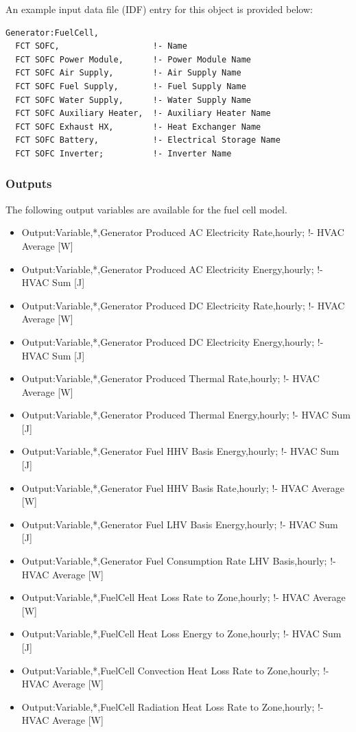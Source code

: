 An example input data file (IDF) entry for this object is provided below:

\begin{lstlisting}
Generator:FuelCell,
  FCT SOFC,                   !- Name
  FCT SOFC Power Module,      !- Power Module Name
  FCT SOFC Air Supply,        !- Air Supply Name
  FCT SOFC Fuel Supply,       !- Fuel Supply Name
  FCT SOFC Water Supply,      !- Water Supply Name
  FCT SOFC Auxiliary Heater,  !- Auxiliary Heater Name
  FCT SOFC Exhaust HX,        !- Heat Exchanger Name
  FCT SOFC Battery,           !- Electrical Storage Name
  FCT SOFC Inverter;          !- Inverter Name
\end{lstlisting}

\subsubsection{Outputs}\label{outputs-9-001}

The following output variables are available for the fuel cell model.

\begin{itemize}
\item
  Output:Variable,*,Generator Produced AC Electricity Rate,hourly; !- HVAC Average {[}W{]}
\item
  Output:Variable,*,Generator Produced AC Electricity Energy,hourly; !- HVAC Sum {[}J{]}
\item
  Output:Variable,*,Generator Produced DC Electricity Rate,hourly; !- HVAC Average {[}W{]}
\item
  Output:Variable,*,Generator Produced DC Electricity Energy,hourly; !- HVAC Sum {[}J{]}
\item
  Output:Variable,*,Generator Produced Thermal Rate,hourly; !- HVAC Average {[}W{]}
\item
  Output:Variable,*,Generator Produced Thermal Energy,hourly; !- HVAC Sum {[}J{]}
\item
  Output:Variable,*,Generator Fuel HHV Basis Energy,hourly; !- HVAC Sum {[}J{]}
\item
  Output:Variable,*,Generator Fuel HHV Basis Rate,hourly; !- HVAC Average {[}W{]}
\item
  Output:Variable,*,Generator Fuel LHV Basis Energy,hourly; !- HVAC Sum {[}J{]}
\item
  Output:Variable,*,Generator Fuel Consumption Rate LHV Basis,hourly; !- HVAC Average {[}W{]}
\item
  Output:Variable,*,FuelCell Heat Loss Rate to Zone,hourly; !- HVAC Average {[}W{]}
\item
  Output:Variable,*,FuelCell Heat Loss Energy to Zone,hourly; !- HVAC Sum {[}J{]}
\item
  Output:Variable,*,FuelCell Convection Heat Loss Rate to Zone,hourly; !- HVAC Average {[}W{]}
\item
  Output:Variable,*,FuelCell Radiation Heat Loss Rate to Zone,hourly; !- HVAC Average {[}W{]}
\end{itemize}

